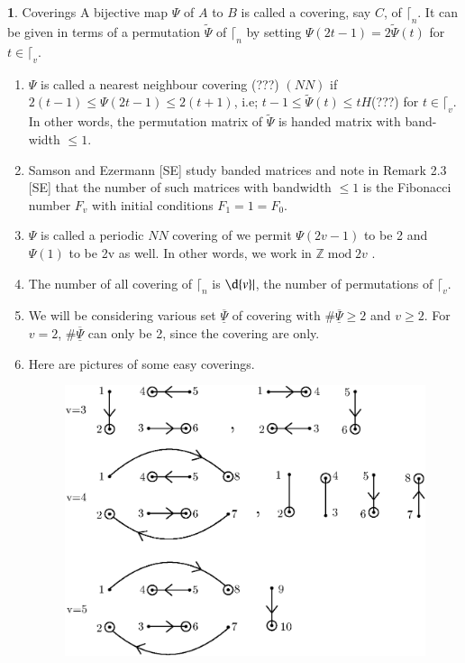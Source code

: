 \documentclass[a4paper,12pt]{article}
\DeclareMathOperator{\md}{\mathrm{mod}}
\theoremstyle{definition}
\theoremstyle{underlinethm}
\theoremstyle{underline}
\newtheorem{subsubsec}{}[subsection]
\begin{document}
\begin{subsubsec}\label{subsubsection-3.1.1}
Coverings A bijective map $\Psi$ of $A$ to $B$ is called a covering, say $C$, of $\lceil_{n}$. It can be given in terms of a permutation $\widetilde{\Psi}$ of $\lceil_{n}$ by setting $\Psi(2t-1) = 2\widetilde{\Psi}(t)$ for $t \in \lceil_{v}$.
  \begin{enumerate}[label=(\alph*)]
  \item $\Psi$ is called a nearest neighbour covering (???) $(NN)$ if $2(t-1) \leq \Psi(2t-1) \leq 2(t+1)$, i.e; $t-1 \leq \widetilde{\Psi}(t) \leq t H$(???) for $t \in \lceil_{v}$. In other words, the permutation matrix of $\widetilde{\Psi}$ is handed matrix with band-width $\leq 1$.
   \item Samson and Ezermann [SE] study banded matrices and note in Remark 2.3 [SE] that the number of such matrices with bandwidth $\leq 1$ is the Fibonacci number $F_{v}$ with initial conditions $F_{1}=1 =F_{0}$.
   \item $\Psi$ is called a periodic $NN$ covering of we permit $\Psi(2v-1)$ to be 2 and $\Psi(1)$ to be 2v as well. In other words, we work in $\mathbb{Z} \md 2v$ .
   \item The number of all covering of $\lceil_{n}$ is $\d{v}|$, the number of permutations of $\lceil_{v}$.
    \item We will be considering various set $\underline{\overline\Psi}$ of covering with $\#\underline{\overline\Psi} \geq 2$ and $v \geq 2$. For $v=2$, $\#\underline{\overline\Psi}$ can only be 2, since the covering are only.
    
    \newpage
    
    \item Here are pictures of some easy coverings.
    
    \begin{figure}[h]
\centering
\includegraphics[scale=.8]{figure/fig3.1.eps}
\caption{}\label{fig03}
\end{figure}

  \end{enumerate}
\end{subsubsec}
\end{document}
